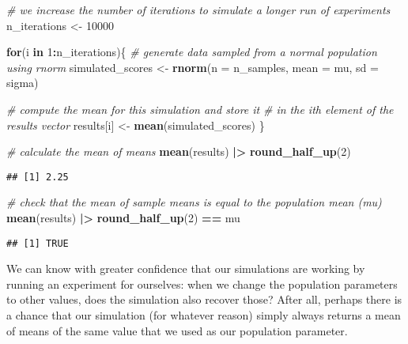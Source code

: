 \documentclass[
]{article}
\newenvironment{Shaded}{\begin{snugshade}}{\end{snugshade}}
\newcommand{\AttributeTok}[1]{\textcolor[rgb]{0.13,0.29,0.53}{#1}}
\newcommand{\CommentTok}[1]{\textcolor[rgb]{0.56,0.35,0.01}{\textit{#1}}}
\newcommand{\ControlFlowTok}[1]{\textcolor[rgb]{0.13,0.29,0.53}{\textbf{#1}}}
\newcommand{\DecValTok}[1]{\textcolor[rgb]{0.00,0.00,0.81}{#1}}
\newcommand{\FunctionTok}[1]{\textcolor[rgb]{0.13,0.29,0.53}{\textbf{#1}}}
\newcommand{\NormalTok}[1]{#1}
\newcommand{\OtherTok}[1]{\textcolor[rgb]{0.56,0.35,0.01}{#1}}
\newcommand{\SpecialCharTok}[1]{\textcolor[rgb]{0.81,0.36,0.00}{\textbf{#1}}}
\begin{document}
\begin{Shaded}
\begin{Highlighting}[]
\CommentTok{\# we increase the number of iterations to simulate a longer run of experiments}
\NormalTok{n\_iterations }\OtherTok{\textless{}{-}} \DecValTok{10000}

\ControlFlowTok{for}\NormalTok{(i }\ControlFlowTok{in} \DecValTok{1}\SpecialCharTok{:}\NormalTok{n\_iterations)\{}
  \CommentTok{\# generate data sampled from a normal population using rnorm}
\NormalTok{  simulated\_scores }\OtherTok{\textless{}{-}} 
    \FunctionTok{rnorm}\NormalTok{(}\AttributeTok{n =}\NormalTok{ n\_samples, }
          \AttributeTok{mean =}\NormalTok{ mu, }
          \AttributeTok{sd =}\NormalTok{ sigma)}
  
  \CommentTok{\# compute the mean for this simulation and store it }
  \CommentTok{\# in the \textasciigrave{}i\textasciigrave{}th element of the results vector}
\NormalTok{  results[i] }\OtherTok{\textless{}{-}} \FunctionTok{mean}\NormalTok{(simulated\_scores)}
\NormalTok{\}}

\CommentTok{\# calculate the mean of means }
\FunctionTok{mean}\NormalTok{(results) }\SpecialCharTok{|\textgreater{}}
  \FunctionTok{round\_half\_up}\NormalTok{(}\DecValTok{2}\NormalTok{)}
\end{Highlighting}
\end{Shaded}

\begin{verbatim}
## [1] 2.25
\end{verbatim}

\begin{Shaded}
\begin{Highlighting}[]
\CommentTok{\# check that the mean of sample means is equal to the population mean (mu)}
\FunctionTok{mean}\NormalTok{(results) }\SpecialCharTok{|\textgreater{}} \FunctionTok{round\_half\_up}\NormalTok{(}\DecValTok{2}\NormalTok{) }\SpecialCharTok{==}\NormalTok{ mu}
\end{Highlighting}
\end{Shaded}

\begin{verbatim}
## [1] TRUE
\end{verbatim}

We can know with greater confidence that our simulations are working by
running an experiment for ourselves: when we change the population
parameters to other values, does the simulation also recover those?
After all, perhaps there is a chance that our simulation (for whatever
reason) simply always returns a mean of means of the same value that we
used as our population parameter.
\end{document}
